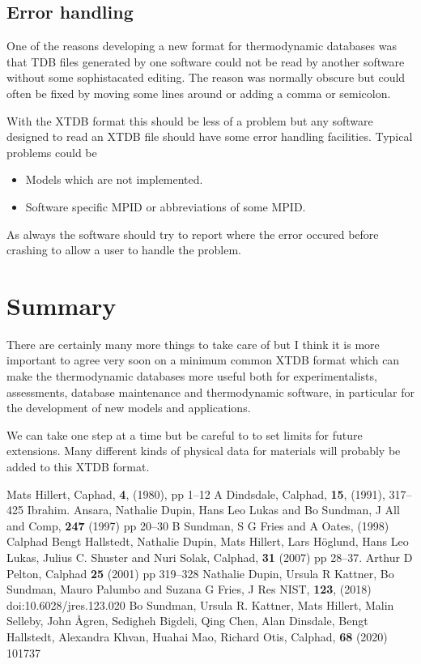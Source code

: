 \documentclass{article}
\begin{document}
\subsection{Error handling}

One of the reasons developing a new format for thermodynamic databases
was that TDB files generated by one software could not be read by
another software without some sophistacated editing.  The reason was
normally obscure but could often be fixed by moving some lines around
or adding a comma or semicolon.

With the XTDB format this should be less of a problem but any software
designed to read an XTDB file should have some error handling
facilities.  Typical problems could be

\begin{itemize}
\item Models which are not implemented.
\item Software specific MPID or abbreviations of some MPID.
\end{itemize}

As always the software should try to report where the error occured
before crashing to allow a user to handle the problem.

\section{Summary}

There are certainly many more things to take care of but I think it is
more important to agree very soon on a minimum common XTDB format
which can make the thermodynamic databases more useful both for
experimentalists, assessments, database maintenance and thermodynamic
software, in particular for the development of new models and
applications.

We can take one step at a time but be careful to to set limits for
future extensions.  Many different kinds of physical data for
materials will probably be added to this XTDB format.

\begin{thebibliography}{00Zzzz}
 Mats Hillert,  Caphad, {\bf 4}, (1980), pp 1--12
 A Dindsdale, Calphad, {\bf 15}, (1991), 317--425
 Ibrahim. Ansara, Nathalie Dupin, Hans Leo Lukas and Bo Sundman,
  J All and Comp, {\bf 247} (1997) pp 20--30
 B Sundman, S G Fries and A Oates, (1998) Calphad
 Bengt Hallstedt, Nathalie Dupin, Mats Hillert, Lars
  H{\"o}glund, Hans Leo Lukas, Julius C. Shuster and Nuri Solak,
  Calphad, {\bf 31} (2007) pp 28--37.
 Arthur D Pelton, Calphad {\bf 25} (2001) pp 319--328
 Nathalie Dupin, Ursula R Kattner, Bo Sundman, Mauro
  Palumbo and Suzana G Fries, J Res NIST, {\bf 123}, (2018)
  doi:10.6028/jres.123.020
 Bo Sundman, Ursula R. Kattner, Mats Hillert, Malin
  Selleby, John Ågren, Sedigheh Bigdeli, Qing Chen, Alan Dinsdale,
  Bengt Hallstedt, Alexandra Khvan, Huahai Mao, Richard Otis, Calphad,
  {\bf 68} (2020) 101737
\end{thebibliography}
\end{document}
